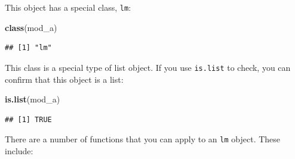 \documentclass[]{book}
\makeatletter
\newenvironment{Shaded}{\begin{snugshade}}{\end{snugshade}}
\newcommand{\KeywordTok}[1]{\textcolor[rgb]{0.13,0.29,0.53}{\textbf{{#1}}}}
\newcommand{\NormalTok}[1]{{#1}}
\newenvironment{kframe}{%
\medskip{}
\setlength{\fboxsep}{.8em}
 \def\at@end@of@kframe{}%
 \ifinner\ifhmode%
  \def\at@end@of@kframe{\end{minipage}}%
  \begin{minipage}{\columnwidth}%
 \fi\fi%
 \def\FrameCommand##1{\hskip\@totalleftmargin \hskip-\fboxsep
 \colorbox{shadecolor}{##1}\hskip-\fboxsep
     \hskip-\linewidth \hskip-\@totalleftmargin \hskip\columnwidth}%
 \MakeFramed {\advance\hsize-\width
   \@totalleftmargin\z@ \linewidth\hsize
   \@setminipage}}%
 {\par\unskip\endMakeFramed%
 \at@end@of@kframe}
\renewenvironment{Shaded}{\begin{kframe}}{\end{kframe}}
\makeatother
\begin{document}
This object has a special class, \texttt{lm}:

\begin{Shaded}
\begin{Highlighting}[]
\KeywordTok{class}\NormalTok{(mod_a)}
\end{Highlighting}
\end{Shaded}

\begin{verbatim}
## [1] "lm"
\end{verbatim}

This class is a special type of list object. If you use \texttt{is.list}
to check, you can confirm that this object is a list:

\begin{Shaded}
\begin{Highlighting}[]
\KeywordTok{is.list}\NormalTok{(mod_a)}
\end{Highlighting}
\end{Shaded}

\begin{verbatim}
## [1] TRUE
\end{verbatim}

There are a number of functions that you can apply to an \texttt{lm}
object. These include:
\end{document}
